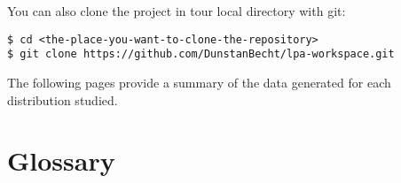 \begin{appendix}
You can also clone the project in tour local directory with git:

\begin{tcolorbox}[width=\linewidth, title=shell]
\begin{verbatim}
$ cd <the-place-you-want-to-clone-the-repository>
$ git clone https://github.com/DunstanBecht/lpa-workspace.git
\end{verbatim}
\end{tcolorbox}

\bigskip

The following pages provide a summary of the data generated for each distribution studied.

\newpage

\begin{multicols}{2}



\null

\end{multicols}

\section{Glossary}

\printnoidxglossaries

\printbibliography[heading=bibintoc, heading=bibnumbered]

\end{appendix}

